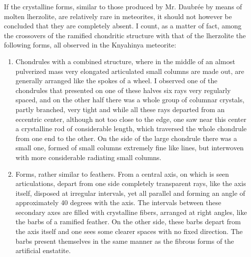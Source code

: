 \documentclass[a4paper, 12pt, oneside]{article}
\begin{document}
If the crystalline forms, similar to those produced by Mr. Daubrée by means of molten lherzolite, are relatively rare in meteorites, it should not however be concluded that they are completely absent. I count, as a matter of fact, among the crossovers of the ramified chondritic structure with that of the lherzolite the following forms, all observed in the Knyahinya meteorite:
\begin{enumerate}
\item Chondrules with a combined structure, where in the middle of an almost pulverized mass very elongated articulated small columns are made out, are generally arranged like the spokes of a wheel. I observed one of the chondrules that presented on one of these halves six rays very regularly spaced, and on the other half there was a whole group of columnar crystals, partly branched, very tight and while all these rays departed from an eccentric center, although not too close to the edge, one saw near this center a crystalline rod of considerable length, which traversed the whole chondrule from one end to the other. On the side of the large chondrule there was a small one, formed of small columns extremely fine like lines, but interwoven with more considerable radiating small columns.
\item Forms, rather similar to feathers. From a central axis, on which is seen articulations, depart from one side completely transparent rays, like the axis itself, disposed at irregular intervals, yet all parallel and forming an angle of approximately 40 degrees with the axis. The intervals between these secondary axes are filled with crystalline fibers, arranged at right angles, like the barbs of a ramified feather. On the other side, these barbs depart from the axis itself and one sees some clearer spaces with no fixed direction. The barbs present themselves in the same manner as the fibrous forms of the artificial enstatite.

\end{enumerate}
\end{document}
